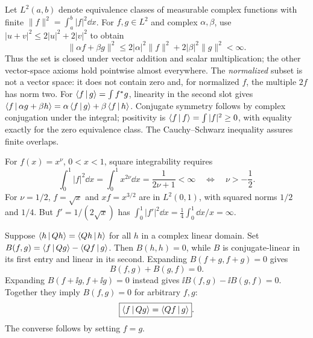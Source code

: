 Let $L^2(a,b)$ denote equivalence classes of measurable complex functions
with finite $\|f\|^2=\int_a^b|f|^2\dd x$.
For $f,g\in L^2$ and complex $\alpha,\beta$, use
$|u+v|^2\le2|u|^2+2|v|^2$ to obtain
\begin{equation}
\|\alpha f+\beta g\|^2\le
2|\alpha|^2\|f\|^2+2|\beta|^2\|g\|^2<\infty.
\end{equation}
Thus the set is closed under vector addition and scalar multiplication;
the other vector-space axioms hold pointwise almost everywhere.
The \emph{normalized} subset is not a vector space: it does
not contain zero and, for normalized $f$, the multiple $2f$
has norm two.
For $\left\langle f\,\middle|\,g\right\rangle=\int f^*g$, linearity in the second slot gives
$\left\langle f\,\middle|\,\alpha g+\beta h\right\rangle=\alpha\left\langle f\,\middle|\,g\right\rangle+
\beta\left\langle f\,\middle|\,h\right\rangle$. Conjugate symmetry follows by complex
conjugation under the integral; positivity is
$\left\langle f\,\middle|\,f\right\rangle=\int|f|^2\ge0$, with equality exactly
for the zero equivalence class. The Cauchy--Schwarz
inequality assures finite overlaps.

For $f(x)=x^\nu$, $0<x<1$, square integrability requires
\begin{equation}
\int_0^1|f|^2\dd x
=\int_0^1x^{2\nu}\dd x
=\frac{1}{2\nu+1}<\infty
\quad\Longleftrightarrow\quad\boxed{\nu>-\frac12}.
\end{equation}
For $\nu=1/2$, $f=\sqrt x$ and $xf=x^{3/2}$
are in $L^2(0,1)$, with squared norms $1/2$ and $1/4$.
But $f'=1/(2\sqrt x)$ has
$\int_0^1|f'|^2\dd x=\frac14\int_0^1\dd x/x=\infty$.

Suppose $\left\langle h\,\middle|\,Qh\right\rangle=\left\langle Qh\,\middle|\,h\right\rangle$ for all
$h$ in a complex linear domain.
Set $B(f,g)=\left\langle f\,\middle|\,Qg\right\rangle-\left\langle Qf\,\middle|\,g\right\rangle$.
Then $B(h,h)=0$, while $B$ is conjugate-linear
in its first entry and linear in its second.
Expanding $B(f+g,f+g)=0$ gives
\begin{equation}
B(f,g)+B(g,f)=0.
\end{equation}
Expanding $B(f+\ii g,f+\ii g)=0$ instead gives
$\ii B(f,g)-\ii B(g,f)=0$. Together they imply
$B(f,g)=0$ for arbitrary $f,g$:
\begin{equation}
\boxed{\left\langle f\,\middle|\,Qg\right\rangle=\left\langle Qf\,\middle|\,g\right\rangle}.
\end{equation}
The converse follows by setting $f=g$.

